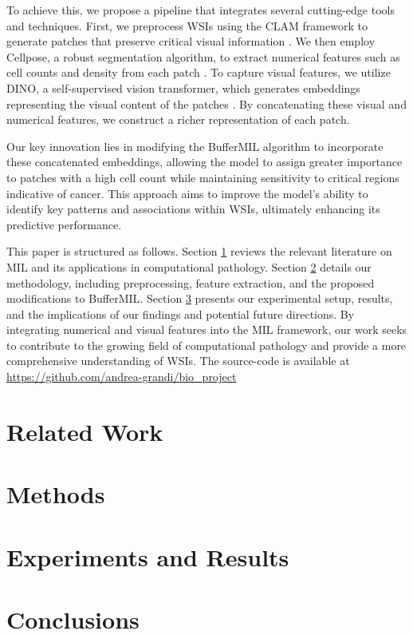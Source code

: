 \documentclass[10pt,twocolumn]{article}
\begin{document}
To achieve this, we propose a pipeline that integrates several cutting-edge tools and techniques. First, we preprocess WSIs using the CLAM framework to generate patches that preserve critical visual information \cite{lu2021clam}. We then employ Cellpose, a robust segmentation algorithm, to extract numerical features such as cell counts and density from each patch \cite{stringer2021cellpose}. To capture visual features, we utilize DINO, a self-supervised vision transformer, which generates embeddings representing the visual content of the patches \cite{caron2021emerging}. By concatenating these visual and numerical features, we construct a richer representation of each patch.

Our key innovation lies in modifying the BufferMIL algorithm to incorporate these concatenated embeddings, allowing the model to assign greater importance to patches with a high cell count while maintaining sensitivity to critical regions indicative of cancer. This approach aims to improve the model's ability to identify key patterns and associations within WSIs, ultimately enhancing its predictive performance.

This paper is structured as follows. Section \ref{related} reviews the relevant literature on MIL and its applications in computational pathology. Section \ref{methods} details our methodology, including preprocessing, feature extraction, and the proposed modifications to BufferMIL. Section \ref{results} presents our experimental setup, results, and the implications of our findings and potential future directions. By integrating numerical and visual features into the MIL framework, our work seeks to contribute to the growing field of computational pathology and provide a more comprehensive understanding of WSIs.
The source-code is available at \url{https://github.com/andrea-grandi/bio_project}


\section{Related Work} \label{related}

\section{Methods} \label{methods}

\section{Experiments and Results} \label{results}

\section{Conclusions} \label{conclusions}



\end{document}
